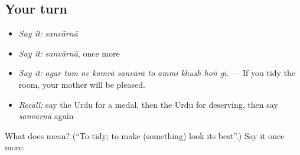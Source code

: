\subsection*{Your turn}
\begin{itemize}
\raggedright
  \item \emph{Say it:} \emph{sanvārnā}
  \item \emph{Say it:} \emph{sanvārnā}, once more
  \item \emph{Say it:} \emph{agar tum ne kamrā sanvārā to ammī khush hoṅ gī.} — If you tidy the room, your mother will be pleased.
  \item \emph{Recall:} say the Urdu for a medal, then the Urdu for deserving, then say \emph{sanvārnā} again
\end{itemize}

\begin{tcolorbox}[breakable,colback=teal!4,colframe=teal!35!black,title={Before you move on}]
What does  mean? (\textquotedblleft{}To tidy; to make (something) look its best\textquotedblright{}.) Say it once more.
\end{tcolorbox}
